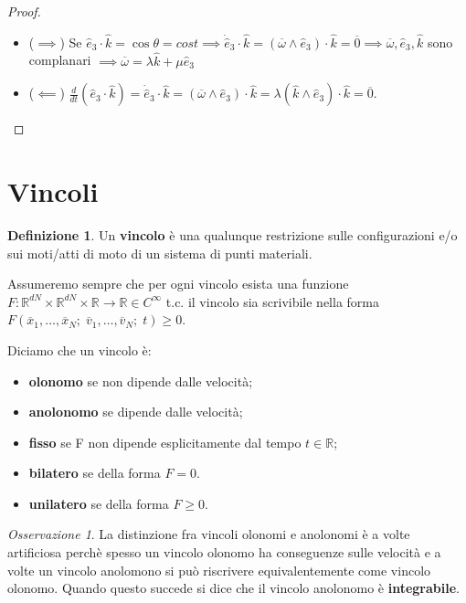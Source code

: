 \documentclass{book}
\theoremstyle{plain}
\theoremstyle{plain}
\theoremstyle{plain}
\theoremstyle{plain}
\theoremstyle{plain}
\theoremstyle{definition}
\newtheorem{defi}{Definizione}[chapter]
\theoremstyle{remark}
\newtheorem*{oss}{Osservazione}
\theoremstyle{definition}
\begin{document}
\begin{proof}

    \noindent 
    \begin{itemize}
        \item ($\implies$) Se $\hat{e}_3\cdot\hat{k}=\cos{\theta}=cost\implies\Dot{\hat{e}}_3\cdot\hat{k}=(\overline{\omega}\wedge\hat{e}_3)\cdot\hat{k}=\overline{0}\implies\overline{\omega}, \hat{e}_3,\hat{k}$ sono complanari $\implies\overline{\omega}=\lambda\hat{k}+\mu\hat{e}_{3}$
        \item ($\impliedby$) $\frac{d}{dt}(\hat{e}_3\cdot\hat{k})=\Dot{\hat{e}}_3\cdot\hat{k}=(\overline{\omega}\wedge\hat{e}_3)\cdot\hat{k}=\lambda(\hat{k}\wedge\hat{e}_3)\cdot\hat{k}=\overline{0}$.
    \end{itemize}
\end{proof}

\section{Vincoli}

\begin{defi}
    Un \textbf{vincolo} è una qualunque restrizione sulle configurazioni e/o sui moti/atti di moto di un sistema di punti materiali.
\end{defi}

\noindent Assumeremo sempre che per ogni vincolo esista una funzione $F: \mathbb{R}^{dN} \times \mathbb{R}^{dN} \times \mathbb{R} \to \mathbb{R} \in C^{\infty}$ t.c. il vincolo sia scrivibile nella forma $F\left(\overline{x}_{1}, \ldots, \overline{x}_{N}; \; \overline{v}_{1}, \ldots, \overline{v}_{N};\; t\right) \geq 0$.

\noindent Diciamo che un vincolo è:

\begin{itemize}
    \item \textbf{olonomo} se non dipende dalle velocità;
    \item \textbf{anolonomo} se dipende dalle velocità;
    \item \textbf{fisso} se F non dipende esplicitamente dal tempo $t \in \mathbb{R}$;
    \item \textbf{bilatero} se della forma $F = 0$.
    \item \textbf{unilatero} se della forma $F \geq 0$.
\end{itemize}

\begin{oss}
    La distinzione fra vincoli olonomi e anolonomi è a volte artificiosa perchè spesso un vincolo olonomo ha conseguenze sulle velocità e a volte un vincolo anolomono si può riscrivere equivalentemente come vincolo olonomo. Quando questo succede si dice che il vincolo anolonomo è \textbf{integrabile}.
\end{oss}
\end{document}
